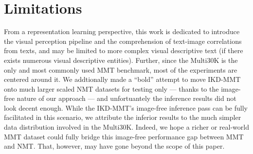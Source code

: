 \documentclass[11pt]{article}
\begin{document}
\section*{Limitations}
From a representation learning perspective, this work is dedicated to introduce the visual perception pipeline and the comprehension of text-image correlations from texts, and may be limited to more complex visual descriptive text (if there exists numerous visual descriptive entities).
Further, since the Multi30K is the only and most commonly used MMT benchmark, most of the experiments are centered around it.
We addtionally made a ``bold'' attempt to move IKD-MMT onto much larger scaled NMT datasets for testing only --- thanks to the image-free nature of our approach --- and unfortuantely the inference results did not look decent enough.
While the IKD-MMT's image-free inference pass can be fully facilitated in this scenario,
we attribute the inferior results to the much simpler data distribution involved in the Multi30K. Indeed, we hope a richer or real-world MMT dataset could fully bridge this image-free performance gap between MMT and NMT.
That, however, may have gone beyond the scope of this paper.




\appendix
\end{document}
